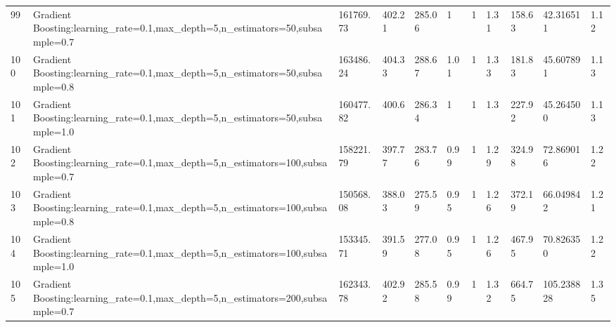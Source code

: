 \begin{longtable}{C{0.8cm} L{2cm} C{1.15cm} C{1.15cm} C{1.15cm} C{1.15cm} C{0.85cm} C{1.25cm} C{1.2cm} C{1.5cm} C{1.0cm}}
99 & Gradient Boosting:\newline learning\_rate=0.1,\newline max\_depth=5,\newline n\_estimators=50,\newline subsample=0.7 & 161769.73 & 402.21 & 285.06 & 1 & 1 & 1.31 & 158.63 & 42.316511 & 1.12 \\
100 & Gradient Boosting:\newline learning\_rate=0.1,\newline max\_depth=5,\newline n\_estimators=50,\newline subsample=0.8 & 163486.24 & 404.33 & 288.67 & 1.01 & 1 & 1.33 & 181.83 & 45.607891 & 1.13 \\
101 & Gradient Boosting:\newline learning\_rate=0.1,\newline max\_depth=5,\newline n\_estimators=50,\newline subsample=1.0 & 160477.82 & 400.6 & 286.34 & 1 & 1 & 1.3 & 227.92 & 45.264500 & 1.13 \\
102 & Gradient Boosting:\newline learning\_rate=0.1,\newline max\_depth=5,\newline n\_estimators=100,\newline subsample=0.7 & 158221.79 & 397.77 & 283.76 & 0.99 & 1 & 1.29 & 324.98 & 72.869016 & 1.22 \\
103 & Gradient Boosting:\newline learning\_rate=0.1,\newline max\_depth=5,\newline n\_estimators=100,\newline subsample=0.8 & 150568.08 & 388.03 & 275.59 & 0.95 & 1 & 1.26 & 372.19 & 66.049842 & 1.21 \\
104 & Gradient Boosting:\newline learning\_rate=0.1,\newline max\_depth=5,\newline n\_estimators=100,\newline subsample=1.0 & 153345.71 & 391.59 & 277.08 & 0.95 & 1 & 1.26 & 467.95 & 70.826350 & 1.22 \\
105 & Gradient Boosting:\newline learning\_rate=0.1,\newline max\_depth=5,\newline n\_estimators=200,\newline subsample=0.7 & 162343.78 & 402.92 & 285.58 & 0.99 & 1 & 1.32 & 664.75 & 105.238828 & 1.35 \\

\end{longtable}
